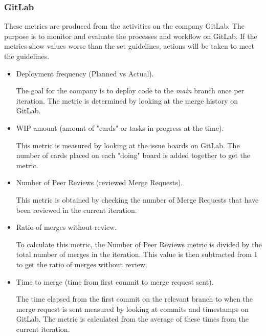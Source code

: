 \subsubsection{GitLab}
These metrics are produced from the activities on the company GitLab. The purpose is to monitor and evaluate the processes and workflow on GitLab. If the metrics show values worse than the set guidelines, actions will be taken to meet the guidelines.

\begin{itemize}
    \item Deployment frequency (Planned vs Actual).
    
    The goal for the company is to deploy code to the \emph{main} branch once per iteration. The metric is determined by looking at the merge history on GitLab.
    
    \item WIP amount (amount of "cards" or tasks in progress at the time).
    
    This metric is measured by looking at the issue boards on GitLab. The number of cards placed on each "doing" board is added together to get the metric. 
    
    \item Number of Peer Reviews (reviewed Merge Requests).
    
    This metric is obtained by checking the number of Merge Requests that have been reviewed in the current iteration.
    
    \item Ratio of merges without review.
    
    To calculate this metric, the Number of Peer Reviews metric is divided by the total number of merges in the iteration. This value is then subtracted from 1 to get the ratio of merges without review.
    
    \item Time to merge (time from first commit to merge request sent).
    
    The time elapsed from the first commit on the relevant branch to when the merge request is sent measured by looking at commits and timestamps on GitLab. The metric is calculated from the average of these times from the current iteration.
    

\end{itemize}
